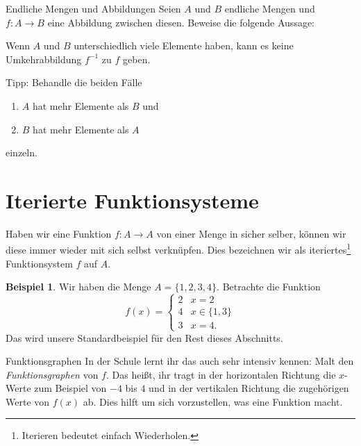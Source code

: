 \documentclass[a4paper,ngerman,12pt]{zirkelblatt1415}
\theoremstyle{definition}
\newtheorem{beispiel}[definition]{Beispiel}
\theoremstyle{remark}
\begin{document}
\begin{aufgabe}{Endliche Mengen und Abbildungen}
Seien $A$ und $B$ endliche Mengen und $f:A\longrightarrow B$ eine Abbildung zwischen diesen. Beweise die folgende Aussage:

Wenn $A$ und $B$ unterschiedlich viele Elemente haben, kann es keine Umkehrabbildung $f^{-1}$ zu $f$ geben.

Tipp: Behandle die beiden Fälle
\begin{enumerate}
\item $A$ hat mehr Elemente als $B$ und
\item $B$ hat mehr Elemente als $A$
\end{enumerate}
einzeln.
\end{aufgabe}



\section{Iterierte Funktionsysteme}

Haben wir eine Funktion $f:A\longrightarrow A$ von einer Menge in sicher selber, können wir diese immer wieder mit sich selbst verknüpfen. Dies bezeichnen wir als iteriertes\footnote{Iterieren bedeutet einfach Wiederholen.} Funktionsystem $f$ auf $A$.
\begin{beispiel}
\label{bsp11}
Wir haben die Menge $A=\{1,2,3,4 \}$. Betrachte die Funktion
\[
f(x)=\begin{cases}
2 & x=2 \\
4 & x\in\{1,3\} \\
3 & x=4.
\end{cases}
\]
Das wird unsere Standardbeispiel für den Rest dieses Abschnitts. 
\end{beispiel}

\begin{aufgabe}{Funktionsgraphen}
  In der Schule lernt ihr das auch sehr intensiv kennen: Malt den \emph{Funktionsgraphen} von $f$. Das heißt, ihr tragt in der horizontalen Richtung die $x$-Werte zum Beispiel von $-4$ bis $4$ und in der vertikalen Richtung die zugehörigen Werte von $f(x)$ ab. Dies hilft um sich vorzustellen, was eine Funktion macht.
\end{aufgabe}
\end{document}
